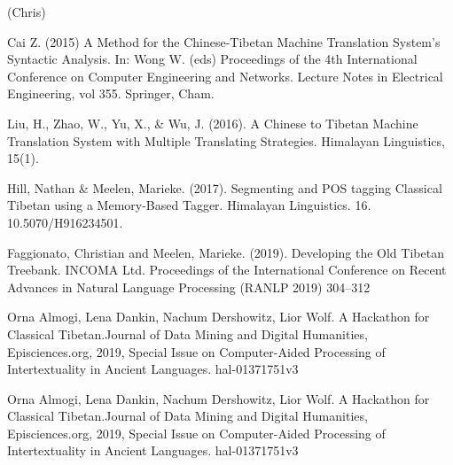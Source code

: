 \documentclass[letterpaper, 10 pt, conference]{ieeeconf}  %
\begin{document}
(Chris)
\begin{thebibliography}{99}



 Cai Z. (2015) A Method for the Chinese-Tibetan Machine Translation System’s Syntactic Analysis. In: Wong W. (eds) Proceedings of the 4th International Conference on Computer Engineering and Networks. Lecture Notes in Electrical Engineering, vol 355. Springer, Cham. 

 Liu, H., Zhao, W., Yu, X., & Wu, J. (2016). A Chinese to Tibetan Machine Translation System with Multiple Translating Strategies. Himalayan Linguistics, 15(1).

 Hill, Nathan & Meelen, Marieke. (2017). Segmenting and POS tagging Classical Tibetan using a Memory-Based Tagger. Himalayan Linguistics. 16. 10.5070/H916234501. 

 Faggionato, Christian  and Meelen, Marieke. (2019). Developing the Old Tibetan Treebank. INCOMA Ltd. Proceedings of the International Conference on Recent Advances in Natural Language Processing (RANLP 2019) 304--312


 Orna Almogi, Lena Dankin, Nachum Dershowitz, Lior Wolf. A Hackathon for Classical Tibetan.Journal of Data Mining and Digital Humanities, Episciences.org, 2019, Special Issue on Computer-Aided Processing of Intertextuality in Ancient Languages. hal-01371751v3

 Orna Almogi, Lena Dankin, Nachum Dershowitz, Lior Wolf. A Hackathon for Classical Tibetan.Journal of Data Mining and Digital Humanities, Episciences.org, 2019, Special Issue on Computer-Aided Processing of Intertextuality in Ancient Languages. hal-01371751v3







\end{thebibliography}
\end{document}
